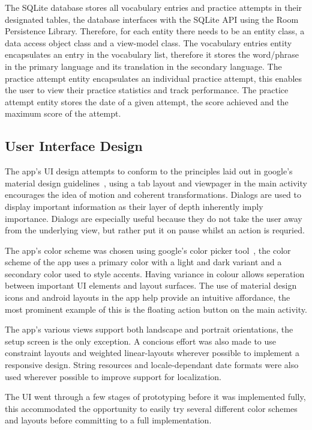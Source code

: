 \documentclass[runningheads]{llncs}
\begin{document}
	The SQLite database stores all vocabulary entries and practice attempts in their designated tables, the database interfaces with the SQLite API using the Room Persistence Library. Therefore, for each entity there needs to be an entity class, a data access object class and a view-model class. The vocabulary entries entity encapsulates an entry in the vocabulary list, therefore it stores the word/phrase in the primary language and its translation in the secondary language. The practice attempt entity encapsulates an individual practice attempt, this enables the user to view their practice statistics and track performance. The practice attempt entity stores the date of a given attempt, the score achieved and the maximum score of the attempt. 
	
	\subsection{User Interface Design}
	The app's UI design attempts to conform to the principles laid out in google's material design guidelines~\cite{ref_material_design}, using a tab layout and viewpager in the main activity encourages the idea of motion and coherent transformations. Dialogs are used to display important information as their layer of depth inherently imply importance. Dialogs are especially useful because they do not take the user away from the underlying view, but rather put it on pause whilst an action is requried.
	
	The app's color scheme was chosen using google's color picker tool~\cite{ref_color_tool}, the color scheme of the app uses a primary color with a light and dark variant and a secondary color used to style accents. Having variance in colour allows seperation between important UI elements and layout surfaces. The use of material design icons and android layouts in the app help provide an intuitive affordance, the most prominent example of this is the floating action button on the main activity.
	
	The app's various views support both landscape and portrait orientations, the setup screen is the only exception. A concious effort was also made to use constraint layouts and weighted linear-layouts wherever possible to implement a responsive design. String resources and locale-dependant date formats were also used wherever possible to improve support for localization.
	
	The UI went through a few stages of prototyping before it was implemented fully, this accommodated the opportunity to easily try several different color schemes and layouts before committing to a full implementation.
	
\end{document}
